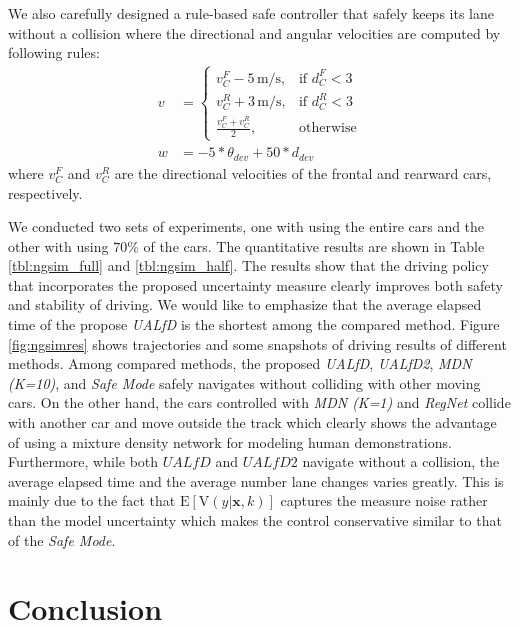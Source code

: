 \documentclass[letterpaper, 10 pt, conference]{ieeeconf}  %
\def\Bx{\mathbf{x}} \def\By{\mathbf{y}} \def\Bp{\mathbf{p}}
\begin{document}
We also carefully designed a rule-based safe controller 
that safely keeps its lane without a collision
where the directional and angular velocities are computed 
by following rules:
\begin{align*}
	v &= 
	\begin{cases}
    		v^F_C-5\,\text{m/s},		& \text{if  $d^F_C < 3$} 
		\\
    		v^R_C+3\,\text{m/s},           & \text{if  $d^R_C < 3$} 
		\\
    		\frac{v^F_C+v^R_C}{2},              & \text{otherwise}
	\end{cases}
	\\
	w &= -5*\theta_{dev} + 50*d_{dev}
\end{align*}
where $v^F_C$ and $v^R_C$ 
are the directional velocities of the frontal and rearward cars, 
respectively.


We conducted two sets of experiments, 
one with using the entire cars
and the other with using $70\%$ of the cars.
The quantitative results are shown in Table \ref{tbl:ngsim_full}
and \ref{tbl:ngsim_half}. 
The results show that the driving policy that incorporates
the proposed uncertainty measure clearly improves
both safety and stability of driving.
We would like to emphasize that the average elapsed time of 
the propose \textit{UALfD} is the shortest among 
the compared method.
Figure \ref{fig:ngsimres} shows trajectories and some snapshots of
driving results of different methods. 
Among compared methods, the proposed \textit{UALfD}, 
\textit{UALfD2}, 
\textit{MDN (K=10)},
and \textit{Safe Mode} safely navigates without colliding
with other moving cars.
On the other hand, the cars controlled with 
\textit{MDN (K=1)} and \textit{RegNet} 
collide with another car and 
move outside the track
which clearly shows the advantage of using a mixture density network 
for modeling human demonstrations.  
Furthermore, while both $\textit{UALfD}$ and $\textit{UALfD2}$
navigate without a collision, the average elapsed time 
and the average number lane changes varies greatly.
This is mainly due to the fact that 
$\mathrm{E}[\mathrm{V}(y|\Bx, k)]$
captures the measure noise rather than 
the model uncertainty which makes the control 
conservative similar to that of the \textit{Safe Mode}.


\section{Conclusion}
\end{document}

